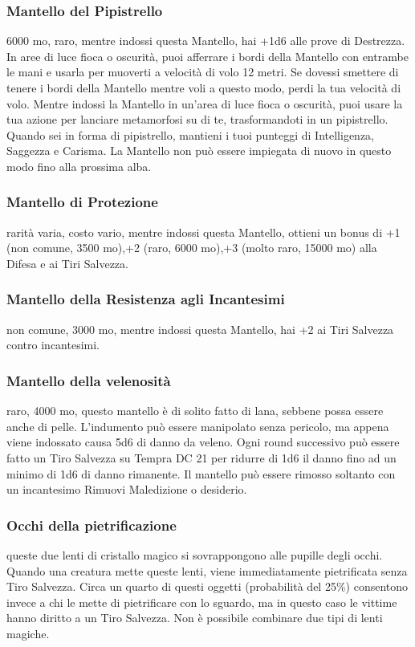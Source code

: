 \begin{multicols}{2}
\subsubsection*{Mantello del Pipistrello}
6000 mo, raro, mentre indossi questa Mantello, hai +1d6 alle prove di Destrezza. In aree di luce fioca o oscurità, puoi afferrare i bordi della Mantello con entrambe le mani e usarla per muoverti a velocità di volo 12 metri. Se dovessi smettere di tenere i bordi della Mantello mentre voli a questo modo, perdi la tua velocità di volo. Mentre indossi la Mantello in un'area di luce fioca o oscurità, puoi usare la tua azione per lanciare metamorfosi su di te, trasformandoti in un pipistrello. Quando sei in forma di pipistrello, mantieni i tuoi punteggi di Intelligenza, Saggezza e Carisma. La Mantello non può essere impiegata di nuovo in questo modo fino alla prossima alba.

\subsubsection*{Mantello di Protezione}
rarità varia, costo vario, mentre indossi questa Mantello, ottieni un bonus di +1 (non comune, 3500 mo),+2 (raro, 6000 mo),+3 (molto raro, 15000 mo) alla Difesa e ai Tiri Salvezza.

\subsubsection*{Mantello della Resistenza agli Incantesimi}
non comune, 3000 mo, mentre indossi questa Mantello, hai +2 ai Tiri Salvezza contro incantesimi.


\subsubsection*{Mantello della velenosità}
raro, 4000 mo, questo mantello è di solito fatto di lana, sebbene possa essere anche di pelle. L’indumento può essere manipolato senza pericolo, ma appena viene indossato causa 5d6 di danno da veleno. Ogni round successivo può essere fatto un Tiro Salvezza su Tempra DC 21 per ridurre di 1d6 il danno fino ad un minimo di 1d6 di danno rimanente. Il mantello può essere rimosso soltanto con un incantesimo Rimuovi Maledizione o desiderio.

\subsubsection*{Occhi della pietrificazione}
queste due lenti di cristallo magico si sovrappongono alle pupille degli occhi. Quando una creatura mette queste lenti, viene immediatamente pietrificata senza Tiro Salvezza. Circa un quarto di questi oggetti (probabilità del 25\%) consentono invece a chi le mette di pietrificare con lo sguardo, ma in questo caso le vittime hanno diritto a un Tiro Salvezza. Non è possibile combinare due tipi di lenti magiche.


\end{multicols}
